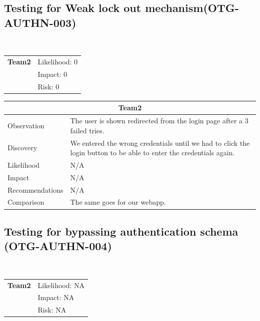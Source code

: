 \documentclass[headsepline,footsepline,footinclude=false,oneside,fontsize=11pt,paper=a4,listof=totoc,bibliography=totoc]{scrbook} %
\begin{document}
\subsection{Testing for Weak lock out mechanism(OTG-AUTHN-003)}\
\begin{tabular}{cR{12cm}}
	\textbf{Team2} & Likelihood: 0\\& Impact: 0\\& Risk: 0
\end{tabular}

\begin{tabular}{ l|p{11cm}  }
	\hline
	\multicolumn{2}{c}{\textbf{Team2}} \\
	\hline
	Observation   & The user is shown redirected from the login page after a 3 failed tries. \\
	Discovery  &We entered the wrong credentials until we had to click the login button to be able to enter the credentials again.\\
	Likelihood & N/A \\
	Impact    &  N/A \\
	Recommendations &  N/A\\
	Comparison & The same goes for our webapp.\\
	\hline
\end{tabular}

\pagebreak
\subsection{Testing for bypassing authentication schema (OTG-AUTHN-004)}\

\begin{tabular}{cR{12cm}}
	\textbf{Team2} & Likelihood: NA\\& Impact: NA\\& Risk: NA
\end{tabular}
\end{document}
